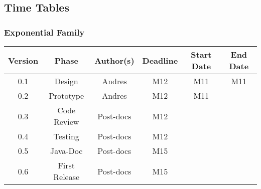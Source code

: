 \newpage
\subsection{Time Tables}

\subsubsection*{Exponential Family}

\begin{table}[H]
\begin{tabular}{cccccc}
\hline
\textbf{Version} & \textbf{Phase} & \textbf{Author(s)} & \textbf{Deadline} & \textbf{Start Date} & \textbf{End Date}\\
\hline
0.1 & Design & Andres & M12 & M11 & M11\\
\hline 
0.2 & Prototype & Andres & M12 & M11 & \\
\hline 
0.3 & Code Review & Post-docs &  M12 &  & \\
\hline 
0.4 & Testing & Post-docs &  M12 & & \\
\hline 
0.5 & Java-Doc  & Post-docs &  M15 & & \\
\hline 
0.6 & First Release & Post-docs &  M15 & & \\
\hline
\end{tabular}
\end{table}


